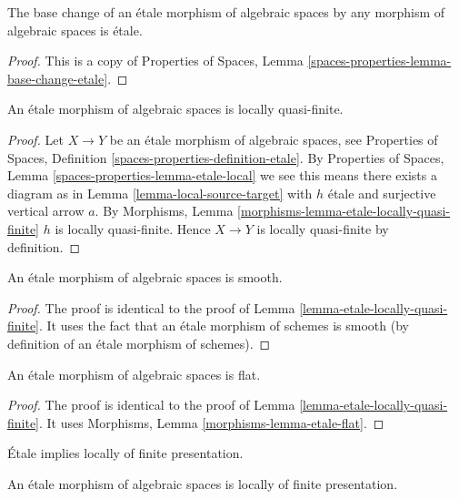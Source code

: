 \begin{lemma}
\label{lemma-base-change-etale}
The base change of an \'etale morphism of algebraic spaces
by any morphism of algebraic spaces is \'etale.
\end{lemma}

\begin{proof}
This is a copy of
Properties of Spaces, Lemma \ref{spaces-properties-lemma-base-change-etale}.
\end{proof}

\begin{lemma}
\label{lemma-etale-locally-quasi-finite}
An \'etale morphism of algebraic spaces is locally quasi-finite.
\end{lemma}

\begin{proof}
Let $X \to Y$ be an \'etale morphism of algebraic spaces, see
Properties of Spaces, Definition \ref{spaces-properties-definition-etale}.
By
Properties of Spaces, Lemma \ref{spaces-properties-lemma-etale-local}
we see this means there exists a diagram as in
Lemma \ref{lemma-local-source-target}
with $h$ \'etale and surjective vertical arrow $a$. By
Morphisms, Lemma \ref{morphisms-lemma-etale-locally-quasi-finite}
$h$ is locally quasi-finite. Hence $X \to Y$ is locally quasi-finite
by definition.
\end{proof}

\begin{lemma}
\label{lemma-etale-smooth}
An \'etale morphism of algebraic spaces is smooth.
\end{lemma}

\begin{proof}
The proof is identical to the proof of
Lemma \ref{lemma-etale-locally-quasi-finite}.
It uses the fact that an \'etale morphism of schemes is smooth
(by definition of an \'etale morphism of schemes).
\end{proof}

\begin{lemma}
\label{lemma-etale-flat}
An \'etale morphism of algebraic spaces is flat.
\end{lemma}

\begin{proof}
The proof is identical to the proof of
Lemma \ref{lemma-etale-locally-quasi-finite}.
It uses
Morphisms, Lemma \ref{morphisms-lemma-etale-flat}.
\end{proof}

\begin{lemma}
\label{lemma-etale-locally-finite-presentation}
\begin{slogan}
\'Etale implies locally of finite presentation.
\end{slogan}
An \'etale morphism of algebraic spaces is locally of finite presentation.
\end{lemma}

